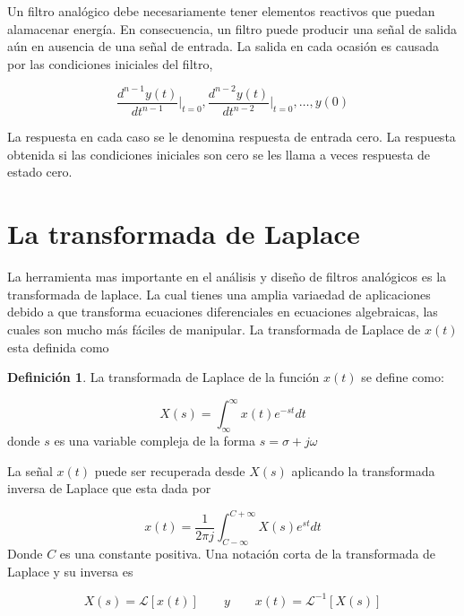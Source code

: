 \documentclass[12pt]{book}
\theoremstyle{definition}
\newtheorem{dfn}{Definición}[section]
\theoremstyle{remark}
\theoremstyle{plain}
\begin{document}
Un filtro analógico debe necesariamente tener elementos reactivos que puedan alamacenar energía. En consecuencia, un filtro puede producir una señal de salida aún en ausencia de una señal de entrada. La salida en cada ocasión es causada por las condiciones iniciales del filtro, 

\begin{equation}
\label{equ29}
 \frac{d^{n-1} y(t)}{dt^{n-1}} \bigg |_{t=0},  \frac{d^{n-2} y(t)}{dt^{n-2}} \bigg |_{t=0}, \dotsc , y(0)
\end{equation}

 La respuesta en cada caso se le denomina respuesta de entrada cero. La respuesta obtenida si las condiciones iniciales son cero se les llama a veces respuesta de estado cero.

\section{La transformada de Laplace}
La herramienta mas importante en el análisis y diseño de filtros analógicos es la transformada de laplace. La cual tienes una amplia variaedad de aplicaciones debido a que transforma ecuaciones diferenciales en ecuaciones algebraicas, las cuales son mucho más fáciles de manipular. La transformada de Laplace de $x(t)$ esta definida como

\begin{dfn}
\label{def4}
La transformada de Laplace de la función $x(t)$ se define como:

\begin{equation}
\label{equ30}
 X(s)=\int_{\infty}^{\infty} x(t) e^{-s t}dt
\end{equation}
donde $s$ es una variable compleja de la forma $s=\sigma +j \omega$
\end{dfn}


La señal $x(t)$ puede ser recuperada desde $X(s)$ aplicando la transformada inversa de Laplace que esta dada por

\begin{equation}
\label{equ31}
 x(t)=\frac{1}{2 \pi j} \int_{C-\infty}^{C+\infty} X(s) e^{s t}dt
\end{equation}
Donde $C$ es una constante positiva. Una notación corta de la transformada de Laplace y su inversa es

\begin{displaymath}
X(s) = \mathcal{L} [x(t)] \qquad y \qquad x(t)= \mathcal{L} ^{-1}[ X(s)]
\end{displaymath}
\end{document}
